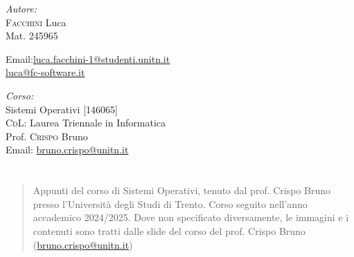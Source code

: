 \documentclass[a4paper,twoside]{report}
\makeatletter
\renewenvironment{abstract}{
    \if@twocolumn
        \section*{\abstractname}%
    \else
        \begin{center}%
            {\bfseries \abstractname\vspace{-.5em}\vspace{\z@}}%
        \end{center}%
        \small
        \begin{quotation}
    \fi}
    {\if@twocolumn\else\end{quotation}\fi}
\makeatother
\begin{document}
\begin{titlepage}
        \vfill
        \begin{minipage}[t]{0.4\textwidth}
            \begin{flushleft} \normalsize
                \emph{Autore:}\\
                \textsc{Facchini} Luca \\ %
                Mat. 245965 \\
                \vspace{-\baselineskip}
                \begin{tabbing}
                    Email:\= \href{mailto:luca.facchini-1@studenti.unitn.it}{luca.facchini-1@studenti.unitn.it} \\
                        \>  \href{mailto:luca@fc-software.it}{luca@fc-software.it}
                \end{tabbing}
            \end{flushleft}
        \end{minipage}%
        \hfill
        \begin{minipage}[t]{0.4\textwidth}
            \begin{flushleft} \normalsize
                \emph{Corso:}\\
                Sistemi Operativi [146065] \\
                \textsc{CdL}: Laurea Triennale in Informatica \\
                Prof. \textsc{Crispo} Bruno \\
                Email: \href{mailto:bruno.crispo@unitn.it}{bruno.crispo@unitn.it}
            \end{flushleft}
        \end{minipage}
        \vfill
        \begin{abstract}
            Appunti del corso di Sistemi Operativi, tenuto dal prof. Crispo Bruno presso l'Università degli Studi di Trento. Corso seguito nell'anno accademico 2024/2025.\newline
            Dove non specificato diversamente, le immagini e i contenuti sono tratti dalle slide del corso del prof. Crispo Bruno (\href{mailto:bruno.crispo@unitn.it}{bruno.crispo@unitn.it})
        \end{abstract}
        
    \end{titlepage}
    \begingroup
        \pagestyle{tocStyle}
        \tableofcontents
    \endgroup
    \thispagestyle{tocStyle}
    \pagestyle{stdPage}
    \newpage

    
    
    
    
    
    
    
    
    
    
\end{document}
